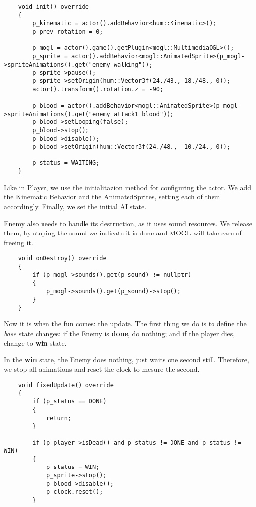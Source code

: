 \begin{lstlisting}
    void init() override
    {
        p_kinematic = actor().addBehavior<hum::Kinematic>();
        p_prev_rotation = 0;

        p_mogl = actor().game().getPlugin<mogl::MultimediaOGL>();
        p_sprite = actor().addBehavior<mogl::AnimatedSprite>(p_mogl->spriteAnimations().get("enemy_walking"));
        p_sprite->pause();
        p_sprite->setOrigin(hum::Vector3f(24./48., 18./48., 0));
        actor().transform().rotation.z = -90;

        p_blood = actor().addBehavior<mogl::AnimatedSprite>(p_mogl->spriteAnimations().get("enemy_attack1_blood"));
        p_blood->setLooping(false);
        p_blood->stop();
        p_blood->disable();
        p_blood->setOrigin(hum::Vector3f(24./48., -10./24., 0));

        p_status = WAITING;
    }
\end{lstlisting}

Like in Player, we use the initialitazion method for configuring the actor. We add 
the Kinematic Behavior and the AnimatedSprites, setting each of them accordingly. Finally, 
we set the initial AI state.

Enemy also needs to handle its destruction, as it uses sound resources. We release them, 
by stoping the sound we indicate it is done and MOGL will take care of freeing it.

\begin{lstlisting}
    void onDestroy() override
    {
        if (p_mogl->sounds().get(p_sound) != nullptr)
        {
            p_mogl->sounds().get(p_sound)->stop();
        }
    }
\end{lstlisting}

Now it is when the fun comes: the update. The first thing we do is to define the \textit{base} 
state changes: if the Enemy is \textbf{done}, do nothing; and if the player dies, 
change to \textbf{win} state.

In the \textbf{win} state, the Enemy does nothing, just waits one second still. Therefore, we 
stop all animations and reset the clock to mesure the second.

\begin{lstlisting}
    void fixedUpdate() override
    {
        if (p_status == DONE)
        {
            return;
        }

        if (p_player->isDead() and p_status != DONE and p_status != WIN)
        {
            p_status = WIN;
            p_sprite->stop();
            p_blood->disable();
            p_clock.reset();
        }
\end{lstlisting}

